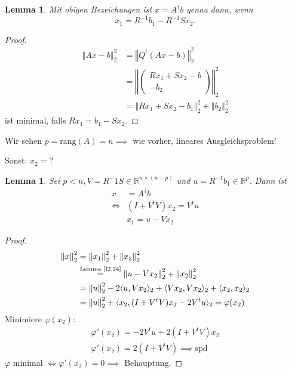 \documentclass{book}
\newtheorem{lemma}[algorithm]{Lemma}
\def\R{\mathbb{R}}
\def\rang{\text{rang}}
\begin{document}
        \begin{lemma}\label{l2.24}
            Mit obigen Bezeichungen ist $x=A^\dagger b$ genau dann, wenn \[x_1=R^{-1}b_1-R^{-1}Sx_2.\]
        \end{lemma}
        \begin{proof}
            \begin{align*}
                \left\Vert Ax-b \right\Vert_2^2&=\left\Vert Q^t(Ax-b) \right\Vert_2^2\\
                &=\left\Vert \begin{pmatrix}
                    Rx_1+Sx_2-b\\
                    -b_2
                \end{pmatrix} \right\Vert_2^2\\
                &= \left\Vert Rx_1+Sx_2 -b_1\right\Vert_2^2+\left\Vert b_2 \right\Vert_2^2
            \end{align*}
            ist minimal, falls $Rx_1=b_1-Sx_2$.
        \end{proof}

        Wir sehen $p=\rang(A)=n\implies$ wie vorher, lineares Ausgleichsproblem!

        Sonst: $x_2=$?

        \begin{lemma}\label{l2.25}
            Sei $p<n,V=R^-1S\in\R^{n\times (n-p)}$ und $u=R^{-1}b_1\in\R^p$. Dann ist
            \begin{align*}
                x&=A^\dagger b\\
                \iff &(I+V^tV)x_2=V^tu\\
                &x_1=u-Vx_2
            \end{align*}
        \end{lemma}

        \begin{proof}
            \begin{align*}
                \left\Vert x \right\Vert_2^2 &= \left\Vert x_1 \right\Vert_2^2 + \left\Vert x_2 \right\Vert_2^2\\
                &\stackrel{\text{Lemma \ref{l2.24}}}{=}\left\Vert u-Vx_2 \right\Vert_2^2+ \left\Vert x_2 \right\Vert_2^2\\
                &=\left\Vert u \right\Vert_2^2-2 \langle u,Vx_2 \rangle_2+\langle Vx_2,Vx_2 \rangle_2+\langle x_2,x_2 \rangle_2\\
                &=\left\Vert u \right\Vert_2^2+\langle x_2,(I+V^tV)x_2-2V^tu \rangle_2 = \varphi(x_2)
            \end{align*}
            Minimiere $\varphi(x_2)$:
            \begin{align*}
                \varphi'(x_2)=-2V^tu+2(I+V^tV)x_2\\
                \varphi'(x_2)=2(I+V^tV) \implies \text{spd}
            \end{align*}
            $\varphi$ minimal $\iff \varphi'(x_2)=0\implies $ Behauptung.
        \end{proof}
\end{document}
